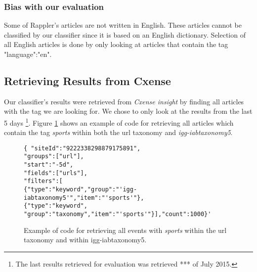\subsubsection{Bias with our evaluation}
Some of Rappler's articles are not written in English. These articles cannot be classified by our classifier since it is based on an English dictionary. Selection of all English articles is done by only looking at articles that contain the tag "language":"en". 



\subsection{Retrieving Results from Cxense}
Our classifier's results were retrieved from \emph{Cxense insight} by finding all articles with the tag we are looking for. We chose to only look at the results from the last 5 days \footnote{The last results retrieved for evaluation was retrieved *** of July 2015.}. Figure \ref{fig:retrievecode} shows an example of code for  retrieving all articles which contain the tag \emph{sports} within both the url taxonomy and \emph{igg-iabtaxonomy5}. 

\begin{figure}[h]
\centering
\begin{lstlisting}
{ "siteId":"9222338298879175891", 
"groups":["url"],
"start":"-5d",
"fields":["urls"],
"filters":[
{"type":"keyword","group":"'igg-iabtaxonomy5'","item":"'sports'"},
{"type":"keyword", "group":"taxonomy","item":"'sports'"}],"count":1000}'
\end{lstlisting}
\caption[Example of code for retrieving results]{Example of code for retrieving all events with \emph{sports} within the url taxonomy and within igg-iabtaxonomy5.}
\label{fig:retrievecode}
\end{figure}


